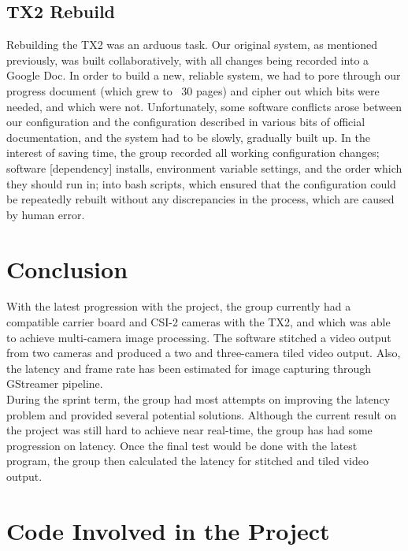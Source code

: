 \documentclass[letterpaper,10pt,serif,draftclsnofoot,onecolumn,compsoc,titlepage]{IEEEtran}
\begin{document}
\subsection{TX2 Rebuild}
Rebuilding the TX2 was an arduous task. Our original system, as mentioned previously, 
was built collaboratively, with all changes being recorded into a Google Doc. In order 
to build a new, reliable system, we had to pore through our progress document 
(which grew to ~30 pages) and cipher out which bits were needed, and which were not. 
Unfortunately, some software conflicts arose between our configuration and the 
configuration described in various bits of official documentation, and the system had 
to be slowly, gradually built up. In the interest of saving time, the group recorded all 
working configuration changes; software [dependency] installs, environment variable 
settings, and the order which they should run in; into bash scripts, which ensured that 
the configuration could be repeatedly rebuilt without any discrepancies in the process, 
which are caused by human error.

\section{Conclusion}

With the latest progression with the project, the group currently had a compatible carrier board 
and CSI-2 cameras with the TX2, and which was able to achieve multi-camera image processing. The 
software stitched a video output from two cameras and produced a two and three-camera tiled video 
output. Also, the latency and frame rate has been estimated for image capturing through GStreamer 
pipeline. \\

During the sprint term, the group had most attempts on improving the latency problem and provided 
several potential solutions. Although the current result on the project was still hard to achieve 
near real-time, the group has had some progression on latency. Once the final test would be done 
with the latest program, the group then calculated the latency for stitched and tiled video output. \\

\section{Code Involved in the Project}
\end{document}
